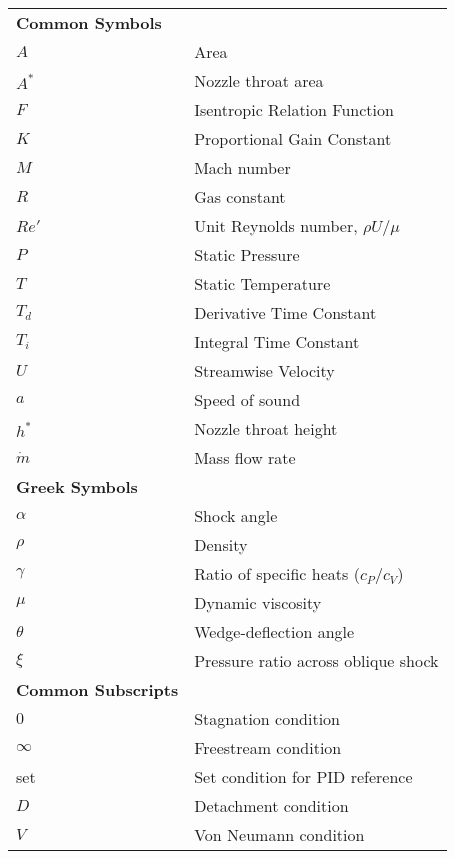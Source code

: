 \begin{spacing}{1.0}
\begin{longtable}[htbp]{@{}p{} p{}@{}}
        \textbf{Common Symbols}\\ [2ex] 
        $A$ & Area \\ [2ex]
        $A^*$ & Nozzle throat area \\ [2ex]
        $F$ & Isentropic Relation Function\\ [2ex]
        $K$ & Proportional Gain Constant \\ [2ex]
        $M$ & Mach number\\ [2ex]
        $R$ & Gas constant\\ [2ex]
        $Re'$ & Unit Reynolds number, $\rho U/\mu$\\ [2ex]
        $P$ & Static Pressure\\ [2ex]
        $T$ & Static Temperature\\ [2ex]
        $T_d$ & Derivative Time Constant\\ [2ex]
        $T_i$ & Integral Time Constant\\ [2ex]
        $U$ & Streamwise Velocity\\ [2ex]
        $a$ & Speed of sound\\ [2ex]
        $h^*$ & Nozzle throat height\\ [2ex]
        $\dot{m}$ & Mass flow rate\\ [2ex]

        \textbf{Greek Symbols}\\ [2ex] 
        $\alpha$ & Shock angle\\ [2ex]
        $\rho$ & Density\\ [2ex]
        $\gamma$ & Ratio of specific heats ($c_P/c_V$) \\ [2ex]
        $\mu$ & Dynamic viscosity\\ [2ex]
        $\theta$ & Wedge-deflection angle \\ [2ex]
        $\xi$ & Pressure ratio across oblique shock\\ [2ex]

        \textbf{Common Subscripts}\\ [2ex] 
        $0$ & Stagnation condition\\ [2ex] 
        $\infty$ & Freestream condition\\ [2ex]
        set & Set condition for PID reference\\ [2ex]
        $D$ & Detachment condition\\ [2ex]
        $V$ & Von Neumann condition\\ [2ex]


	\end{longtable}
\end{spacing}

\pagebreak{}
